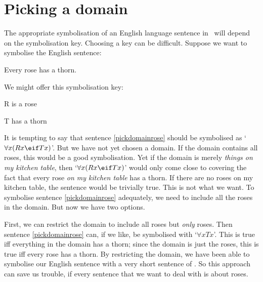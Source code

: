 \section{Picking a domain}
The appropriate symbolisation of an English language sentence in \FOL\ will depend on the symbolisation key. Choosing a key can be difficult. Suppose we want to symbolise the English sentence:
	\begin{earg}
		\item[\ex{pickdomainrose}] Every rose has a thorn.
	\end{earg}
We might offer this symbolisation key:
	\begin{ekey}
		\item[R]  is a rose
		\item[T]  has a thorn
	\end{ekey}
It is tempting to say that sentence \ref{pickdomainrose} should be symbolised as `$\forall x(Rx \eif Tx)$'. But we have not yet chosen a domain. If the domain contains all roses, this would be a good symbolisation. Yet if the domain is merely \emph{things on my kitchen table}, then `$\forall x(Rx \eif Tx)$' would only come close to covering the fact that every rose \emph{on my kitchen table} has a thorn. If there are no roses on my kitchen table, the sentence would be trivially true. This is not what we want. To symbolise sentence \ref{pickdomainrose} adequately, we need to include all the roses in the domain. But now we have two options. 

First, we can restrict the domain to include all roses but \emph{only} roses. Then sentence \ref{pickdomainrose} can, if we like, be symbolised with `$\forall x Tx$'. This is true iff everything in the domain has a thorn; since the domain is just the roses, this is true iff every rose has a thorn. By restricting the domain, we have been able to symbolise our English sentence with a very short sentence of \FOL. So this approach can save us trouble, if every sentence that we want to deal with is about roses.

